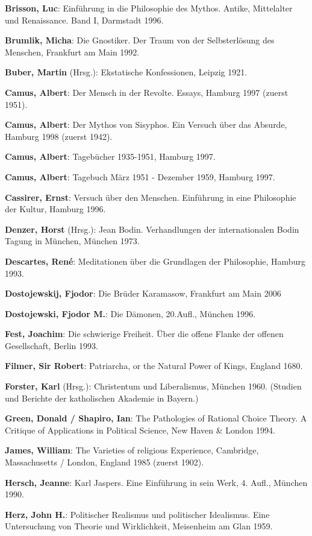 {\bf Brisson, Luc}: Einführung in die Philosophie des Mythos. Antike,
Mittelalter und Renaissance. Band I, Darmstadt 1996.

{\bf Brumlik, Micha}: Die Gnostiker. Der Traum von der Selbsterlösung des
Menschen, Frankfurt am Main 1992.

{\bf Buber, Martin} (Hrsg.): Ekstatische Konfessionen, Leipzig 1921. 

{\bf Camus, Albert}: Der Mensch in der Revolte. Essays, Hamburg 1997 (zuerst
1951).

{\bf Camus, Albert}: Der Mythos von Sisyphos. Ein Versuch über das Absurde,
Hamburg 1998 (zuerst 1942).

{\bf Camus, Albert}: Tagebücher 1935-1951, Hamburg 1997.

{\bf Camus, Albert}: Tagebuch März 1951 - Dezember 1959, Hamburg 1997.

{\bf Cassirer, Ernst}: Versuch über den Menschen. Einführung in eine
Philosophie der Kultur, Hamburg 1996.

{\bf Denzer, Horst} (Hrsg.): Jean Bodin. Verhandlungen der internationalen
Bodin Tagung in München, München 1973.

{\bf Descartes, René}: Meditationen über die Grundlagen der Philosophie,
Hamburg 1993.

{\bf Dostojewskij, Fjodor}: Die Brüder Karamasow, Frankfurt am Main 2006

{\bf Dostojewski, Fjodor M.}: Die Dämonen, 20.Aufl., München 1996.

{\bf Fest, Joachim}: Die schwierige Freiheit. Über die offene Flanke der
offenen Gesellschaft, Berlin 1993.

{\bf Filmer, Sir Robert}: Patriarcha, or the Natural Power of Kings, England
1680.

{\bf Forster, Karl} (Hrsg.): Christentum und Liberalismus, München
1960. (Studien und Berichte der katholischen Akademie in Bayern.)

{\bf Green, Donald / Shapiro, Ian}: The Pathologies of Rational Choice Theory.
A Critique of Applications in Political Science, New Haven \& London 1994.

{\bf James, William}: The Varieties of religious Experience, Cambridge,
Massachusetts / London, England 1985 (zuerst 1902).

{\bf Hersch, Jeanne}: Karl Jaspers. Eine Einführung in sein Werk, 4. Aufl.,
München 1990.

{\bf Herz, John H.}: Politischer Realismus und politischer Idealismus.  Eine
Untersuchung von Theorie und Wirklichkeit, Meisenheim am Glan 1959.

